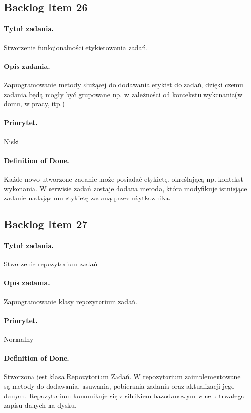 ﻿\documentclass[a4paper]{article}
\begin{document}
\subsection{Backlog Item 26} 
\paragraph{Tytuł zadania.} Stworzenie funkcjonalności etykietowania zadań.
\paragraph{Opis zadania.} Zaprogramowanie metody służącej do dodawania etykiet do zadań, dzięki czemu zadania będą mogły być grupowane np. w zależności od kontekstu wykonania(w domu, w pracy, itp.)
\paragraph{Priorytet.} Niski
\paragraph{Definition of Done.} Każde nowo utworzone zadanie może posiadać etykietę, określającą np. kontekst wykonania. W serwisie zadań zostaje dodana metoda, która modyfikuje istniejące zadanie nadając mu etykietę zadaną przez użytkownika.

\subsection{Backlog Item 27} 
\paragraph{Tytuł zadania.} Stworzenie repozytorium zadań 
\paragraph{Opis zadania.} Zaprogramowanie klasy repozytorium zadań.
\paragraph{Priorytet.} Normalny
\paragraph{Definition of Done.} Stworzona jest klasa Repozytorium Zadań. W repozytorium zaimplementowane są metody do dodawania, usuwania, pobierania zadania  oraz aktualizacji jego danych. Repozytorium komunikuje się z silnikiem bazodanowym w celu trwałego zapisu danych na dysku.
\end{document}
